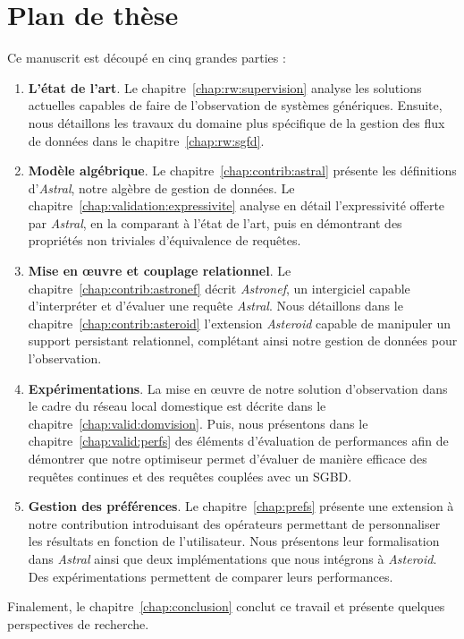 \section{Plan de thèse}\label{sec:intro:plan}
Ce manuscrit est découpé en cinq grandes parties :
\begin{enumerate}
\item \textbf{L'état de l'art}. Le chapitre~\ref{chap:rw:supervision} analyse les solutions actuelles capables de faire de l'observation de systèmes génériques. Ensuite, nous détaillons les travaux du domaine plus spécifique de la gestion des flux de données dans le chapitre~\ref{chap:rw:sgfd}.
\item \textbf{Modèle algébrique}. Le chapitre~\ref{chap:contrib:astral} présente les définitions d'\textit{Astral}, notre algèbre de gestion de données. Le chapitre~\ref{chap:validation:expressivite} analyse en détail l'expressivité offerte par \textit{Astral}, en la comparant à l'état de l'art, puis en démontrant des propriétés non triviales d'équivalence de requêtes. 
\item \textbf{Mise en œuvre et couplage relationnel}. Le chapitre~\ref{chap:contrib:astronef} décrit \textit{Astronef}, un intergiciel capable d'interpréter et d'évaluer une requête \textit{Astral}. Nous détaillons dans le chapitre~\ref{chap:contrib:asteroid} l'extension \textit{Asteroid} capable de manipuler un support persistant relationnel, complétant ainsi notre gestion de données pour l'observation.
\item \textbf{Expérimentations}. La mise en œuvre de notre solution d'observation dans le cadre du réseau local domestique est décrite dans le chapitre~\ref{chap:valid:domvision}. Puis, nous présentons dans le chapitre~\ref{chap:valid:perfs} des éléments d'évaluation de performances afin de démontrer que notre optimiseur permet d'évaluer de manière efficace des requêtes continues et des requêtes couplées avec un SGBD.
\item \textbf{Gestion des préférences}. Le chapitre~\ref{chap:prefs} présente une extension à notre contribution introduisant des opérateurs permettant de personnaliser les résultats en fonction de l'utilisateur. Nous présentons leur formalisation dans \textit{Astral} ainsi que deux implémentations que nous intégrons à \textit{Asteroid}. Des expérimentations permettent de comparer leurs performances.
\end{enumerate}

Finalement, le chapitre~\ref{chap:conclusion} conclut ce travail et présente quelques perspectives de recherche.
